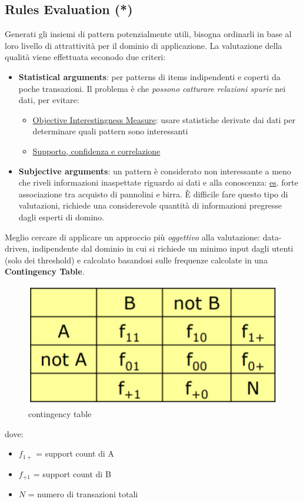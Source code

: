 \subsection{Rules Evaluation (*)}
Generati gli insiemi di pattern potenzialmente utili, bisogna ordinarli in base al loro livello di attrattività per il dominio di applicazione. La valutazione della qualità viene effettuata seconodo due criteri:
\begin{itemize}
	\item \textbf{Statistical arguments}: per patterns di items indipendenti e coperti da poche transazioni. Il problema è che \textit{possono catturare relazioni spurie} nei dati, per evitare:
	\begin{itemize}
		\item \underline{Objective Interestingness Measure}: usare statistiche derivate dai dati per determinare quali pattern sono interessanti
		\item \underline{Supporto, confidenza e correlazione}
	\end{itemize}
	\item \textbf{Subjective arguments}: un pattern è considerato non interessante a meno che riveli informazioni inaspettate riguardo ai dati e alla conoscenza: \underline{es}. forte associazione tra acquisto di pannolini e birra. È difficile fare questo tipo di valutazioni, richiede una considerevole quantità di informazioni pregresse dagli esperti di domino.
\end{itemize}

Meglio cercare di applicare un approccio più \textit{oggettivo} alla valutazione: data-driven, indipendente dal dominio in cui si richiede un minimo input dagli utenti (solo dei threshold) e calcolato basandosi sulle frequenze calcolate in una \textbf{Contingency Table}.
\begin{figure}[H]
	\centering
	\includegraphics[height=0.2 \linewidth]{association/pict/contingency_table.png}
	\caption{contingency table}
\end{figure}
dove:
\begin{itemize}
	\item $f_{1+}$ = support count di A
	\item $f_{+1}$ = support count di B
	\item $N$ = numero di transazioni totali
\end{itemize}

